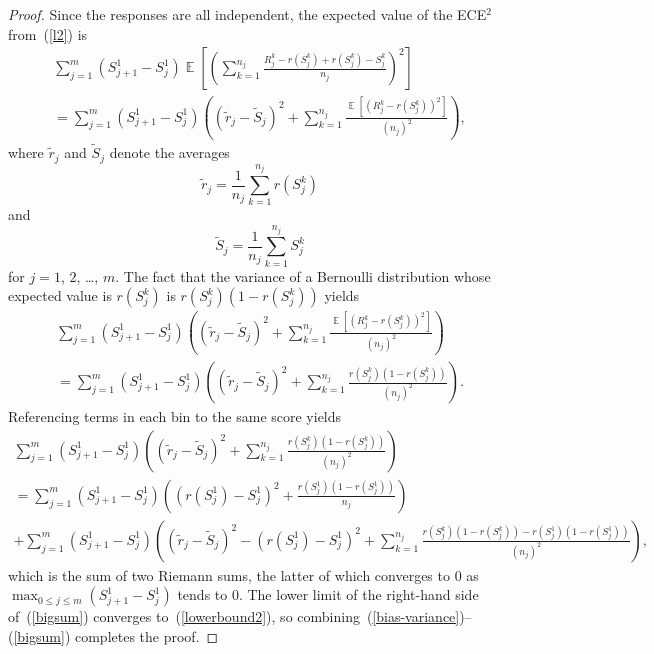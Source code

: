 \documentclass{article}
\DeclareMathOperator{\E}{\mathop{}\mathbb{E}}
\begin{document}
\begin{proof}
Since the responses are all independent, the expected value of the ECE$^2$
from~(\ref{l2}) is
%
\begin{multline}
\label{bias-variance}
\sum_{j=1}^m \left( S_{j+1}^1 - S_j^1 \right)
\E\left[ \left( \sum_{k=1}^{n_j}
\frac{R_j^k - r(S_j^k) + r(S_j^k) - S_j^k}{n_j} \right)^2 \right] \\
= \sum_{j=1}^m \left( S_{j+1}^1 - S_j^1 \right)
\left( \left(\tilde{r}_j - \tilde{S}_j\right)^2 + \sum_{k=1}^{n_j}
\frac{\E\left[\left(R_j^k - r(S_j^k)\right)^2\right]}{(n_j)^2} \right),
\end{multline}
%
where $\tilde{r}_j$ and $\tilde{S}_j$ denote the averages
%
\begin{equation}
\tilde{r}_j = \frac{1}{n_j} \sum_{k=1}^{n_j} r(S_j^k)
\end{equation}
%
and
%
\begin{equation}
\tilde{S}_j = \frac{1}{n_j} \sum_{k=1}^{n_j} S_j^k
\end{equation}
%
for $j = 1$, $2$, \dots, $m$.
The fact that the variance of a Bernoulli distribution whose expected value
is $r(S_j^k)$ is $r(S_j^k) \left( 1 - r(S_j^k) \right)$ yields
%
\begin{multline}
\label{Bernoulli_variance}
\sum_{j=1}^m \left( S_{j+1}^1 - S_j^1 \right)
\left( \left(\tilde{r}_j - \tilde{S}_j\right)^2 + \sum_{k=1}^{n_j}
\frac{\E\left[\left(R_j^k - r(S_j^k)\right)^2\right]}{(n_j)^2} \right) \\
= \sum_{j=1}^m \left( S_{j+1}^1 - S_j^1 \right)
\left( \left(\tilde{r}_j - \tilde{S}_j\right)^2 + \sum_{k=1}^{n_j}
\frac{r(S_j^k) \left( 1 - r(S_j^k) \right)}{(n_j)^2} \right).
\end{multline}
%
Referencing terms in each bin to the same score yields
%
\begin{multline}
\label{bigsum}
\sum_{j=1}^m \left( S_{j+1}^1 - S_j^1 \right)
\left( \left(\tilde{r}_j - \tilde{S}_j\right)^2
+ \sum_{k=1}^{n_j} \frac{r(S_j^k) \left( 1 - r(S_j^k) \right)}{(n_j)^2} \right)
\\ = \sum_{j=1}^m \left( S_{j+1}^1 - S_j^1 \right) \left(
\left(r(S_j^1) - S_j^1\right)^2
+ \frac{r(S_j^1) \left( 1 - r(S_j^1) \right)}{n_j} \right) \\
+ \sum_{j=1}^m \left( S_{j+1}^1 - S_j^1 \right) \left(
\left(\tilde{r}_j - \tilde{S}_j\right)^2
- \left(r(S_j^1) - S_j^1\right)^2
+ \sum_{k=1}^{n_j} \frac{r(S_j^k) \left( 1 - r(S_j^k) \right)
                        -r(S_j^1) \left( 1 - r(S_j^1) \right)}{(n_j)^2}\right),
\end{multline}
%
which is the sum of two Riemann sums, the latter of which converges to 0
as $\max_{0 \le j \le m} (S_{j+1}^1 - S_j^1)$ tends to 0.
The lower limit of the right-hand side of~(\ref{bigsum})
converges to~(\ref{lowerbound2}),
so combining~(\ref{bias-variance})--(\ref{bigsum}) completes the proof.
\end{proof}
\end{document}
